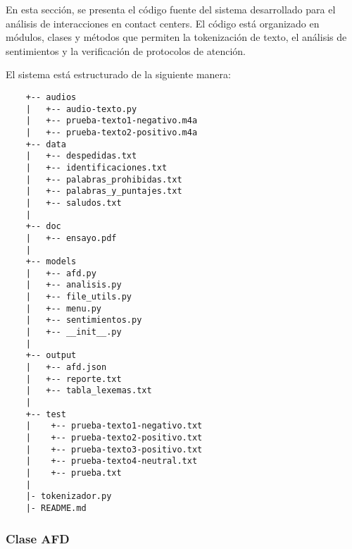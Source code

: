 \documentclass[12pt,a4paper]{article}
\begin{document}
En esta sección, se presenta el código fuente del sistema desarrollado para el análisis de
interacciones en contact centers. El código está organizado en módulos, clases y métodos que
permiten la tokenización de texto, el análisis de sentimientos y la verificación de protocolos
de atención.

El sistema está estructurado de la siguiente manera:
\begin{tcolorbox}[colback=gray!10, colframe=gray!80, sharp corners, boxrule=0.5pt]
	\begin{verbatim}
    +-- audios
    |   +-- audio-texto.py
    |   +-- prueba-texto1-negativo.m4a
    |   +-- prueba-texto2-positivo.m4a
    +-- data
    |   +-- despedidas.txt
    |   +-- identificaciones.txt
    |   +-- palabras_prohibidas.txt
    |   +-- palabras_y_puntajes.txt
    |   +-- saludos.txt
    |
    +-- doc
    |   +-- ensayo.pdf
    |
    +-- models
    |   +-- afd.py
    |   +-- analisis.py
    |   +-- file_utils.py
    |   +-- menu.py
    |   +-- sentimientos.py
    |   +-- __init__.py
    |
    +-- output
    |   +-- afd.json
    |   +-- reporte.txt
    |   +-- tabla_lexemas.txt
    |
    +-- test
    |    +-- prueba-texto1-negativo.txt
    |    +-- prueba-texto2-positivo.txt
    |    +-- prueba-texto3-positivo.txt
    |    +-- prueba-texto4-neutral.txt
    |    +-- prueba.txt
    |
    |- tokenizador.py
    |- README.md

\end{verbatim}
\end{tcolorbox}
\newpage
\subsubsection{Clase AFD}
\end{document}

